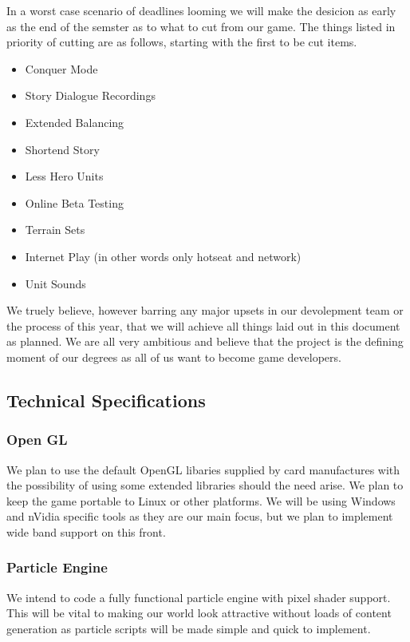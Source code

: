 \documentclass[a4paper]{article}
\begin{document}
In a worst case scenario of deadlines looming we will make the desicion as early as the end of the semster as to what to cut from our game. The things listed in priority of cutting are as follows, starting with the first to be cut items.

\begin{itemize}
\item Conquer Mode
\item Story Dialogue Recordings
\item Extended Balancing
\item Shortend Story
\item Less Hero Units
\item Online Beta Testing
\item Terrain Sets
\item Internet Play (in other words only hotseat and network)
\item Unit Sounds
\end{itemize}

We truely believe, however barring any major upsets in our devolepment team or the process of this year, that we will achieve all things laid out in this document as planned. We are all very ambitious and believe that the project is the defining moment of our degrees as all of us want to become game developers.

\subsection{Technical Specifications}

\subsubsection{Open GL}

We plan to use the default OpenGL libaries supplied by card manufactures with the possibility of using some extended libraries should the need  arise. We plan to keep the game portable to Linux or other platforms. We will be using Windows and nVidia specific tools as they are our main focus, but we plan to implement wide band support on this front.

\subsubsection{Particle Engine}

We intend to code a fully functional particle engine with pixel shader support. This will be vital to making our world look attractive without loads of content generation as particle scripts will be made simple and quick to implement.
\end{document}
